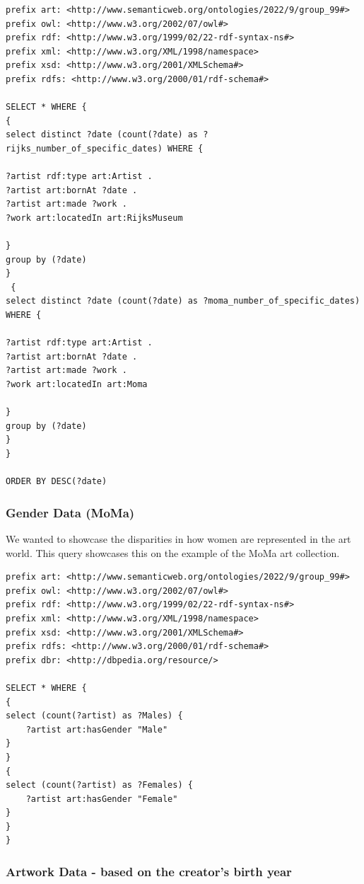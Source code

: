 \documentclass{article}
\begin{document}
\begin{verbatim}
prefix art: <http://www.semanticweb.org/ontologies/2022/9/group_99#> 
prefix owl: <http://www.w3.org/2002/07/owl#> 
prefix rdf: <http://www.w3.org/1999/02/22-rdf-syntax-ns#> 
prefix xml: <http://www.w3.org/XML/1998/namespace> 
prefix xsd: <http://www.w3.org/2001/XMLSchema#> 
prefix rdfs: <http://www.w3.org/2000/01/rdf-schema#> 

SELECT * WHERE { 
{
select distinct ?date (count(?date) as ?rijks_number_of_specific_dates) WHERE { 

?artist rdf:type art:Artist .
?artist art:bornAt ?date .
?artist art:made ?work .
?work art:locatedIn art:RijksMuseum

}
group by (?date)
}
 {
select distinct ?date (count(?date) as ?moma_number_of_specific_dates) WHERE { 

?artist rdf:type art:Artist .
?artist art:bornAt ?date .
?artist art:made ?work .
?work art:locatedIn art:Moma

}
group by (?date)
}
}

ORDER BY DESC(?date)

\end{verbatim}

\subsubsection{Gender Data (MoMa)}


We wanted to showcase the disparities in how women are represented in the art world. This query showcases this on the example of the MoMa art collection.

\begin{verbatim}
prefix art: <http://www.semanticweb.org/ontologies/2022/9/group_99#>
prefix owl: <http://www.w3.org/2002/07/owl#>
prefix rdf: <http://www.w3.org/1999/02/22-rdf-syntax-ns#>
prefix xml: <http://www.w3.org/XML/1998/namespace>
prefix xsd: <http://www.w3.org/2001/XMLSchema#>
prefix rdfs: <http://www.w3.org/2000/01/rdf-schema#>
prefix dbr: <http://dbpedia.org/resource/>

SELECT * WHERE {
{
select (count(?artist) as ?Males) {
    ?artist art:hasGender "Male"
}
}
{
select (count(?artist) as ?Females) {
    ?artist art:hasGender "Female"
}
}
}
\end{verbatim}
\subsubsection{Artwork Data - based on the creator's birth year}
\end{document}
